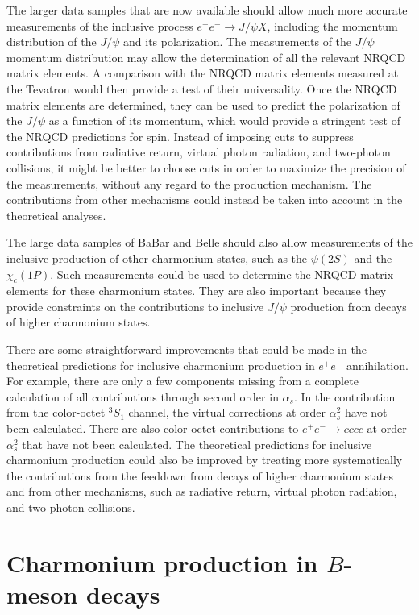 The larger data samples that are now available should allow much more 
accurate measurements of the inclusive process $e^+ e^- \to J/\psi X$,
including the momentum distribution of the $J/\psi$ and its polarization.
The measurements of the $J/\psi$ momentum distribution may allow the
determination of all the relevant NRQCD matrix elements.  A comparison
with the NRQCD matrix elements measured at the Tevatron would then provide 
a test of their universality.  Once the NRQCD matrix elements 
are determined, they can be used to predict the polarization of the 
$J/\psi$ as a function of its momentum, which would provide a stringent 
test of the NRQCD predictions for spin.
Instead of imposing cuts to suppress contributions from radiative return,
virtual photon radiation, and two-photon collisions, it might be better 
to choose cuts in order to maximize the precision of the measurements,
without any regard to the production mechanism.  The contributions 
from other mechanisms could instead be taken into account in the 
theoretical analyses.  

The large data samples of BaBar and Belle should also allow 
measurements of the inclusive production of other charmonium states, 
such as the $\psi(2S)$ and the $\chi_c(1P)$.  Such measurements could be used 
to determine the NRQCD matrix elements for these charmonium states.  
They are also important because they provide constraints on the 
contributions to inclusive $J/\psi$ production from decays of higher 
charmonium states.

There are some straightforward improvements that could be made
in the theoretical predictions for inclusive charmonium production 
in $e^+ e^-$ annihilation.  For example, there are only a few 
components missing from a complete calculation of all 
contributions through second order in $\alpha_s$.
In the contribution from the 
color-octet ${}^3S_1$ channel, the virtual corrections at order 
$\alpha_s^2$ have not been calculated.  There are also color-octet 
contributions to $e^+ e^- \to c \bar c c \bar c$ at order $\alpha_s^2$ 
that have not been calculated.  The theoretical predictions 
for inclusive charmonium production could 
also be improved by treating more systematically the contributions 
from the feeddown from decays of higher charmonium states and from 
other mechanisms, such as radiative return, virtual photon radiation, 
and two-photon collisions.


\section{Charmonium production in $B$-meson decays}
\label{prodsec:bdecays}

